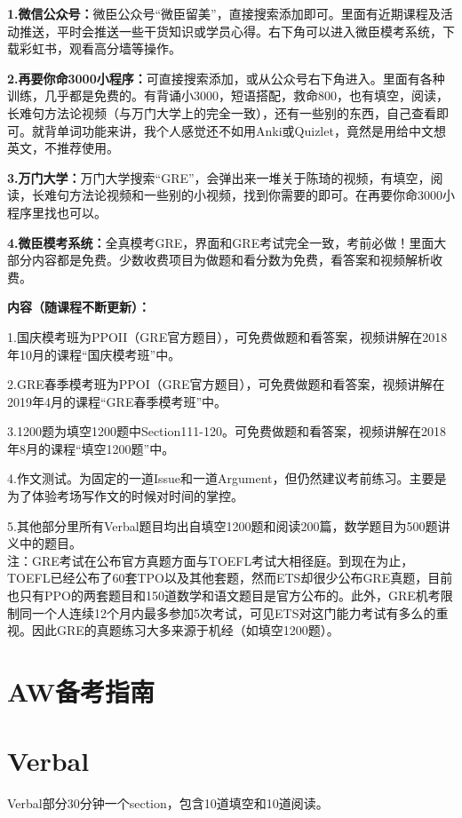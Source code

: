 \documentclass[cn,plain]{./src/qyxfbook}
\begin{document}
	\textbf{1.微信公众号：}微臣公众号“微臣留美”，直接搜索添加即可。里面有近期课程及活动推送，平时会推送一些干货知识或学员心得。右下角可以进入微臣模考系统，下载彩虹书，观看高分墙等操作。\par
	\textbf{2.再要你命3000小程序：}可直接搜索添加，或从公众号右下角进入。里面有各种训练，几乎都是免费的。有背诵小3000，短语搭配，救命800，也有填空，阅读，长难句方法论视频（与万门大学上的完全一致），还有一些别的东西，自己查看即可。就背单词功能来讲，我个人感觉还不如用Anki或Quizlet，竟然是用给中文想英文，不推荐使用。\par
	\textbf{3.万门大学：}万门大学搜索“GRE”，会弹出来一堆关于陈琦的视频，有填空，阅读，长难句方法论视频和一些别的小视频，找到你需要的即可。在再要你命3000小程序里找也可以。\par
	\textbf{4.微臣模考系统：}全真模考GRE，界面和GRE考试完全一致，考前必做！里面大部分内容都是免费。少数收费项目为做题和看分数为免费，看答案和视频解析收费。\par
	
	\textbf{内容（随课程不断更新）：}\par
	
	1.国庆模考班为PPOII（GRE官方题目），可免费做题和看答案，视频讲解在2018年10月的课程“国庆模考班”中。\par
	2.GRE春季模考班为PPOI（GRE官方题目），可免费做题和看答案，视频讲解在2019年4月的课程“GRE春季模考班”中。\par
	3.1200题为填空1200题中Section111-120。可免费做题和看答案，视频讲解在2018年8月的课程“填空1200题”中。\par
	4.作文测试。为固定的一道Issue和一道Argument，但仍然建议考前练习。主要是为了体验考场写作文的时候对时间的掌控。\par
	5.其他部分里所有Verbal题目均出自填空1200题和阅读200篇，数学题目为500题讲义中的题目。\\
	
	注：GRE考试在公布官方真题方面与TOEFL考试大相径庭。到现在为止，TOEFL已经公布了60套TPO以及其他套题，然而ETS却很少公布GRE真题，目前也只有PPO的两套题目和150道数学和语文题目是官方公布的。此外，GRE机考限制同一个人连续12个月内最多参加5次考试，可见ETS对这门能力考试有多么的重视。因此GRE的真题练习大多来源于机经（如填空1200题）。
	
\chapter{AW备考指南}




\chapter{Verbal}
Verbal部分30分钟一个section，包含10道填空和10道阅读。
\end{document}
